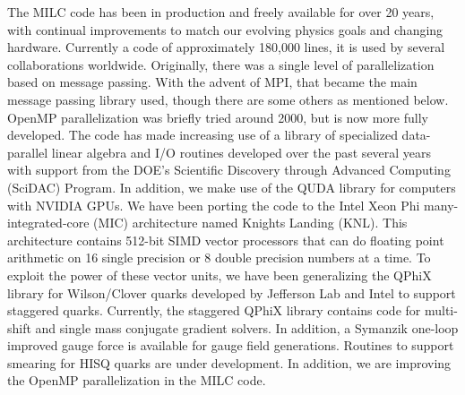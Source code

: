 \documentclass[epj]{webofc}
\begin{document}
The MILC code has been in production and freely available for over 20 years,
with continual improvements to match our evolving
physics goals and changing hardware.
Currently a code of approximately 180,000 lines, it is
used by several collaborations worldwide.
Originally, there was a single level of parallelization based on message
passing.  With the advent of MPI, that became the main message passing 
library used, though there are some others as mentioned below.  OpenMP
parallelization was briefly tried around 2000, but is now more fully
developed.  The code has made increasing use of a library of specialized
data-parallel linear algebra and I/O routines developed over the past
several years with support from the DOE's Scientific Discovery through Advanced Computing (SciDAC) Program.  
In addition, we make use of the QUDA library for computers with NVIDIA GPUs.
We have been porting the code to the Intel Xeon Phi many-integrated-core (MIC) architecture named Knights Landing (KNL).
This architecture contains 512-bit SIMD vector processors that can 
do floating point arithmetic on 16 single precision or 8 double 
precision numbers at a time.
To exploit the power of these vector units, we have been generalizing
the QPhiX library \cite{QPhiX} for Wilson/Clover quarks developed
by Jefferson Lab and Intel to support staggered quarks.
Currently, the staggered QPhiX library contains code for multi-shift
and single mass conjugate gradient solvers.
In addition, a Symanzik one-loop improved gauge force is available for
gauge field generations.  Routines to support smearing for HISQ quarks are
under development.
In addition, we are improving the OpenMP parallelization in the MILC code. \\
\\
\end{document}
